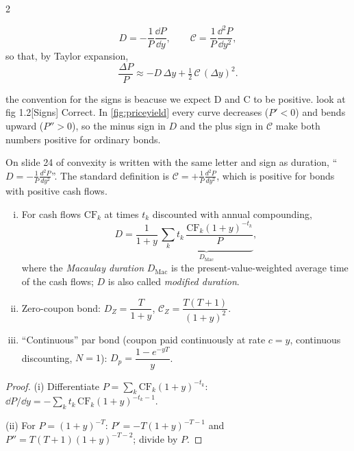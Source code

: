 \begin{paracol}{2}
\begin{definition}
\[
  D = -\frac{1}{P}\frac{\dd P}{\dd y}, \qquad
  \mathcal C = \frac{1}{P}\frac{\dd^2 P}{\dd y^2},
\]
so that, by Taylor expansion,
\begin{equation}\label{eq:durconv}
  \frac{\Delta P}{P} \approx -D\,\Delta y + \tfrac12\,\mathcal C\,(\Delta y)^2 .
\end{equation}
\end{definition}\begin{answer}{the convention for the signs is beacuse we expect D and C to be positive. look at fig 1.2}[Signs]
Correct. In \cref{fig:priceyield} every curve decreases ($P'<0$) and bends upward ($P''>0$), so the minus sign
in $D$ and the plus sign in $\mathcal C$ make both numbers positive for ordinary bonds.
\end{answer}

\begin{coursenote}
On slide 24 of  convexity is written with the same letter and sign as duration,
``$D = -\frac1P\frac{d^2P}{dy^2}$''. The standard definition is $\mathcal C = +\frac1P\frac{d^2P}{dy^2}$,
which is positive for bonds with positive cash flows.
\end{coursenote}

\begin{proposition}\label{prop:duration}
\leavevmode
\begin{enumerate}[(i)]
  \item For cash flows $\mathrm{CF}_k$ at times $t_k$ discounted with annual compounding,
        \[ D = \frac{1}{1+y}\,\underbrace{\sum_k t_k\,\frac{\mathrm{CF}_k(1+y)^{-t_k}}{P}}_{D_{\mathrm{Mac}}}, \]
        where the \emph{Macaulay duration} $D_{\mathrm{Mac}}$ is the present-value-weighted average
        time of the cash flows; $D$ is also called \emph{modified duration}.
  \item Zero-coupon bond: $D_Z = \dfrac{T}{1+y}$, \quad $\mathcal C_Z = \dfrac{T(T+1)}{(1+y)^2}$.
  \item ``Continuous'' par bond (coupon paid continuously at rate $c=y$, continuous discounting,
        $N=1$): $D_p = \dfrac{1-e^{-yT}}{y}$.
\end{enumerate}
\end{proposition}
\begin{proof}
(i) Differentiate $P=\sum_k \mathrm{CF}_k(1+y)^{-t_k}$:
$\dd P/\dd y = -\sum_k t_k\,\mathrm{CF}_k(1+y)^{-t_k-1}$.

(ii) For $P=(1+y)^{-T}$: $P' = -T(1+y)^{-T-1}$ and $P'' = T(T+1)(1+y)^{-T-2}$; divide by $P$.


\end{proof}
\end{paracol}
